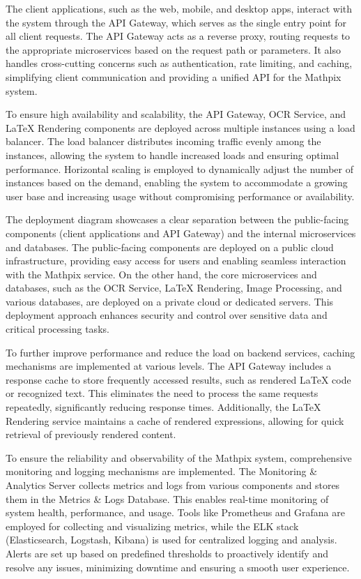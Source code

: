 \documentclass{article}
\begin{document}
The client applications, such as the web, mobile, and desktop apps, interact with the system through the API Gateway, which serves as the single entry point for all client requests. The API Gateway acts as a reverse proxy, routing requests to the appropriate microservices based on the request path or parameters. It also handles cross-cutting concerns such as authentication, rate limiting, and caching, simplifying client communication and providing a unified API for the Mathpix system.

To ensure high availability and scalability, the API Gateway, OCR Service, and LaTeX Rendering components are deployed across multiple instances using a load balancer. The load balancer distributes incoming traffic evenly among the instances, allowing the system to handle increased loads and ensuring optimal performance. Horizontal scaling is employed to dynamically adjust the number of instances based on the demand, enabling the system to accommodate a growing user base and increasing usage without compromising performance or availability.

The deployment diagram showcases a clear separation between the public-facing components (client applications and API Gateway) and the internal microservices and databases. The public-facing components are deployed on a public cloud infrastructure, providing easy access for users and enabling seamless interaction with the Mathpix service. On the other hand, the core microservices and databases, such as the OCR Service, LaTeX Rendering, Image Processing, and various databases, are deployed on a private cloud or dedicated servers. This deployment approach enhances security and control over sensitive data and critical processing tasks.

To further improve performance and reduce the load on backend services, caching mechanisms are implemented at various levels. The API Gateway includes a response cache to store frequently accessed results, such as rendered LaTeX code or recognized text. This eliminates the need to process the same requests repeatedly, significantly reducing response times. Additionally, the LaTeX Rendering service maintains a cache of rendered expressions, allowing for quick retrieval of previously rendered content.


To ensure the reliability and observability of the Mathpix system, comprehensive monitoring and logging mechanisms are implemented. The Monitoring \& Analytics Server collects metrics and logs from various components and stores them in the Metrics \& Logs Database. This enables real-time monitoring of system health, performance, and usage. Tools like Prometheus and Grafana are employed for collecting and visualizing metrics, while the ELK stack (Elasticsearch, Logstash, Kibana) is used for centralized logging and analysis. Alerts are set up based on predefined thresholds to proactively identify and resolve any issues, minimizing downtime and ensuring a smooth user experience.
\end{document}
